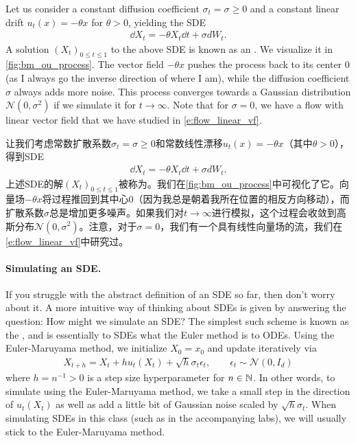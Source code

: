\begin{examplebox}
Let us consider a constant diffusion coefficient $\sigma_t=\sigma\geq 0$ and a constant linear drift $u_t(x)=-\theta x$ for $\theta>0$, yielding the SDE
\begin{align}
\label{eq:ohrstein_uhlenbeck_process}
\dd X_t = -\theta X_t\dd t + \sigma dW_t.
\end{align} 
A solution $(X_t)_{0 \le t \le 1}$ to the above SDE is known as an . We visualize it in \cref{fig:bm_ou_process}. The vector field $-\theta x$ pushes the process back to its center $0$ (as I always go the inverse direction of where I am), while the diffusion coefficient $\sigma$ always adds more noise. This process converges towards a Gaussian distribution $\mathcal{N}(0,\sigma^2)$ if we simulate it for $t\to \infty$. Note that for $\sigma=0$, we have a flow with linear vector field that we have studied in \cref{e:flow_linear_vf}.

让我们考虑常数扩散系数$\sigma_t=\sigma\geq 0$和常数线性漂移$u_t(x)=-\theta x$（其中$\theta>0$），得到SDE
\begin{align}
\dd X_t = -\theta X_t\dd t + \sigma dW_t.
\end{align} 
上述SDE的解$(X_t)_{0 \le t \le 1}$被称为。我们在\cref{fig:bm_ou_process}中可视化了它。向量场$-\theta x$将过程推回到其中心$0$（因为我总是朝着我所在位置的相反方向移动），而扩散系数$\sigma$总是增加更多噪声。如果我们对$t\to \infty$进行模拟，这个过程会收敛到高斯分布$\mathcal{N}(0,\sigma^2)$。注意，对于$\sigma=0$，我们有一个具有线性向量场的流，我们在\cref{e:flow_linear_vf}中研究过。
\end{examplebox}


\paragraph{Simulating an SDE.} If you struggle with the abstract definition of an SDE so far, then don't worry about it. A more intuitive way of thinking about SDEs is given by answering the question: How might we simulate an SDE? The simplest such scheme is known as the , and is essentially to SDEs what the Euler method is to ODEs. Using the Euler-Maruyama method, we initialize $X_0=x_0$ and update iteratively via
\begin{align}
\label{e:euler_method_sdes}
    X_{t+h} = X_{t}+hu_t(X_t) + \sqrt{h}\sigma_t\epsilon_t,\quad \quad \epsilon_t \sim \mathcal{N}(0,I_d)
\end{align}
where $h=n^{-1}>0$ is a step size hyperparameter for $n \in \mathbb N$. In other words, to simulate using the Euler-Maruyama method, we take a small step in the direction of $u_t(X_t)$ as well as add a little bit of Gaussian noise scaled by $\sqrt{h}\sigma_t$. When simulating SDEs in this class (such as in the accompanying labs), we will usually stick to the Euler-Maruyama method.

